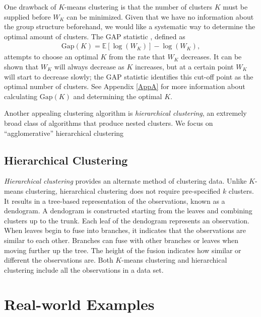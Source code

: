\documentclass[11pt]{article}
\begin{document}
One drawback of $K$-means clustering is that the number of clusters $K$ must be supplied before $W_K$ can be minimized. Given that we have no information about the group structure beforehand, we would like a systematic way to determine the optimal amount of clusters. %
The GAP statistic \cite{tibshirani2001estimating}, defined as 
\begin{align}
    \label{GAPstat}
    \mathrm{Gap}(K) = \mathbb{E} \left[ \log(W_K) \right] - \log(W_K),
\end{align}
attempts to choose an optimal $K$ from the rate that $W_K$ decreases. It can be shown that $W_K$ will always decrease as $K$ increases, but at a certain point $W_K$ will start to decrease slowly; the GAP statistic identifies this cut-off point as the optimal number of clusters. See Appendix \ref{AppA} for more information about calculating $\mathrm{Gap}(K)$ and determining the optimal $K$.

Another appealing clustering algorithm is \textit{hierarchical clustering}, an extremely broad class of algorithms that produce nested clusters. We focus on ``agglomerative'' hierarchical clustering

\newpage


\subsection{Hierarchical Clustering}
\emph{Hierarchical clustering} provides an alternate method of clustering data. Unlike $K$-means clustering, hierarchical clustering does not require pre-specified $k$ clusters. It results in a tree-based representation of the observations, known as a dendogram. A dendogram is constructed starting from the leaves and combining clusters up to the trunk. Each leaf of the dendogram represents an observation. When leaves begin to fuse into branches, it indicates that the observations are similar to each other. Branches can fuse with other branches or leaves when moving further up the tree. The height of the fusion indicates how similar or different the observations are. 
Both $K$-means clustering and hierarchical clustering include all the observations in a data set. 


\section{Real-world Examples}
\end{document}
